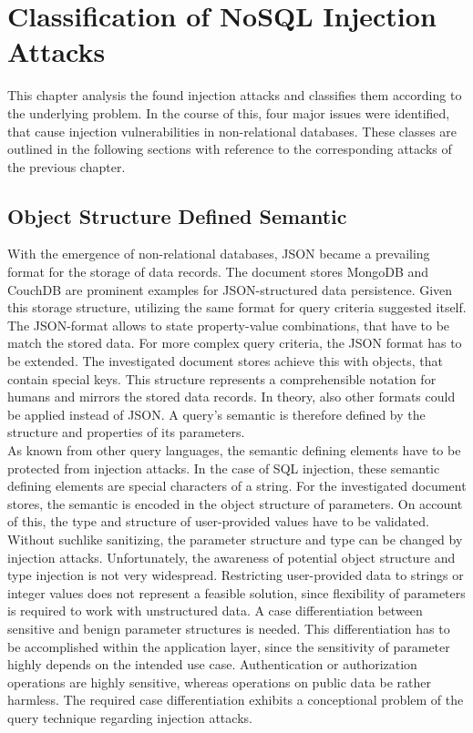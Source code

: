 \chapter{Classification of NoSQL Injection Attacks}
\label{cha:classification}
This chapter analysis the found injection attacks and classifies them according to the underlying problem. In the course of this, four major issues were identified, that cause injection vulnerabilities in non-relational databases. These classes are outlined in the following sections with reference to the corresponding attacks of the previous chapter.

\section{Object Structure Defined Semantic}
With the emergence of non-relational databases, JSON became a prevailing format for the storage of data records. The document stores MongoDB and CouchDB are prominent examples for JSON-structured data persistence. Given this storage structure, utilizing the same format for query criteria suggested itself. The JSON-format allows to state property-value combinations, that have to be match the stored data. For more complex query criteria, the JSON format has to be extended. The investigated document stores achieve this with objects, that contain special keys. This structure represents a comprehensible notation for humans and mirrors the stored data records. In theory, also other formats could be applied instead of JSON. A query's semantic is therefore defined by the structure and properties of its parameters. \\ 

As known from other query languages, the semantic defining elements have to be protected from injection attacks. In the case of SQL injection, these semantic defining elements are special characters of a string. For the investigated document stores, the semantic is encoded in the object structure of parameters. On account of this, the type and structure of user-provided values have to be validated. Without suchlike sanitizing, the parameter structure and type can be changed by injection attacks. Unfortunately, the awareness of potential object structure and type injection is not very widespread. Restricting user-provided data to strings or integer values does not represent a feasible solution, since flexibility of parameters is required to work with unstructured data. A case differentiation between sensitive and benign parameter structures is needed. This differentiation has to be accomplished within the application layer, since the sensitivity of parameter highly depends on the intended use case. Authentication or authorization operations are highly sensitive, whereas operations on public data be rather harmless. The required case differentiation exhibits a conceptional problem of the query technique regarding injection attacks.\\

